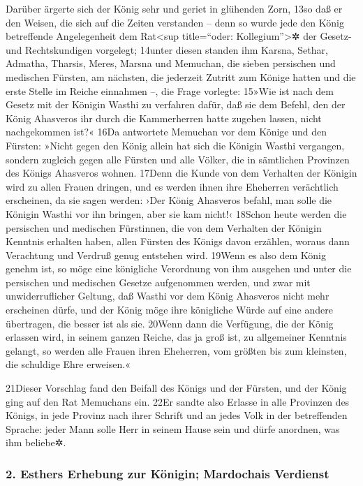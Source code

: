 Darüber ärgerte sich der König sehr und geriet in glühenden Zorn, 13so
daß er den Weisen, die sich auf die Zeiten verstanden -- denn so wurde
jede den König betreffende Angelegenheit dem Rat\textless sup
title=``oder: Kollegium''\textgreater✲ der Gesetz- und Rechtskundigen
vorgelegt; 14unter diesen standen ihm Karsna, Sethar, Admatha, Tharsis,
Meres, Marsna und Memuchan, die sieben persischen und medischen Fürsten,
am nächsten, die jederzeit Zutritt zum Könige hatten und die erste
Stelle im Reiche einnahmen --, die Frage vorlegte: 15»Wie ist nach dem
Gesetz mit der Königin Wasthi zu verfahren dafür, daß sie dem Befehl,
den der König Ahasveros ihr durch die Kammerherren hatte zugehen lassen,
nicht nachgekommen ist?« 16Da antwortete Memuchan vor dem Könige und den
Fürsten: »Nicht gegen den König allein hat sich die Königin Wasthi
vergangen, sondern zugleich gegen alle Fürsten und alle Völker, die in
sämtlichen Provinzen des Königs Ahasveros wohnen. 17Denn die Kunde von
dem Verhalten der Königin wird zu allen Frauen dringen, und es werden
ihnen ihre Eheherren verächtlich erscheinen, da sie sagen werden: ›Der
König Ahasveros befahl, man solle die Königin Wasthi vor ihn bringen,
aber sie kam nicht!‹ 18Schon heute werden die persischen und medischen
Fürstinnen, die von dem Verhalten der Königin Kenntnis erhalten haben,
allen Fürsten des Königs davon erzählen, woraus dann Verachtung und
Verdruß genug entstehen wird. 19Wenn es also dem König genehm ist, so
möge eine königliche Verordnung von ihm ausgehen und unter die
persischen und medischen Gesetze aufgenommen werden, und zwar mit
unwiderruflicher Geltung, daß Wasthi vor dem König Ahasveros nicht mehr
erscheinen dürfe, und der König möge ihre königliche Würde auf eine
andere übertragen, die besser ist als sie. 20Wenn dann die Verfügung,
die der König erlassen wird, in seinem ganzen Reiche, das ja groß ist,
zu allgemeiner Kenntnis gelangt, so werden alle Frauen ihren Eheherren,
vom größten bis zum kleinsten, die schuldige Ehre erweisen.«

21Dieser Vorschlag fand den Beifall des Königs und der Fürsten, und der
König ging auf den Rat Memuchans ein. 22Er sandte also Erlasse in alle
Provinzen des Königs, in jede Provinz nach ihrer Schrift und an jedes
Volk in der betreffenden Sprache: jeder Mann solle Herr in seinem Hause
sein und dürfe anordnen, was ihm beliebe✲.

\hypertarget{esthers-erhebung-zur-kuxf6nigin-mardochais-verdienst}{%
\subsubsection{2. Esthers Erhebung zur Königin; Mardochais
Verdienst}\label{esthers-erhebung-zur-kuxf6nigin-mardochais-verdienst}}


